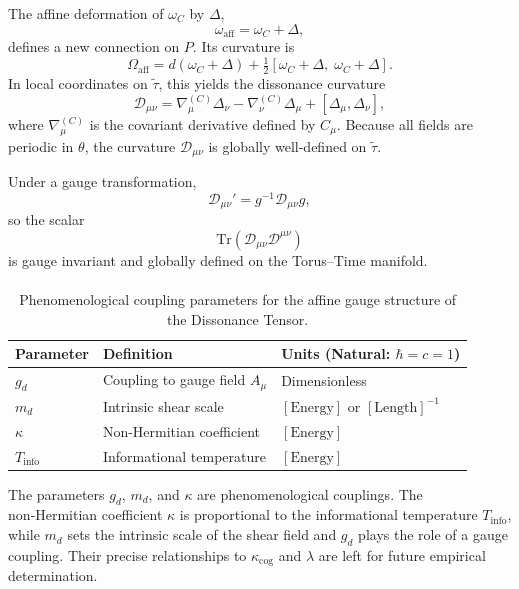 \documentclass[12pt,openany]{book}
\theoremstyle{plain}
\theoremstyle{definition}
\theoremstyle{remark}
\begin{document}
The affine deformation of $\omega_C$ by $\Delta$,
\[
\omega_{\mathrm{aff}} = \omega_C + \Delta,
\]
defines a new connection on $P$. Its curvature is
\[
\Omega_{\mathrm{aff}}
= d(\omega_C + \Delta)
+ \tfrac{1}{2}[\omega_C + \Delta,\; \omega_C + \Delta].
\]
In local coordinates on $\tilde{\tau}$, this yields the dissonance curvature
\[
\mathcal{D}_{\mu\nu}
= \nabla_\mu^{(C)} \Delta_\nu
- \nabla_\nu^{(C)} \Delta_\mu
+ [\Delta_\mu, \Delta_\nu],
\]
where $\nabla_\mu^{(C)}$ is the covariant derivative defined by $C_\mu$.
Because all fields are periodic in $\theta$, the curvature
$\mathcal{D}_{\mu\nu}$ is globally well-defined on $\tilde{\tau}$.

Under a gauge transformation,
\[
\mathcal{D}_{\mu\nu}' = g^{-1} \mathcal{D}_{\mu\nu} g,
\]
so the scalar
\[
\mathrm{Tr}(\mathcal{D}_{\mu\nu}\mathcal{D}^{\mu\nu})
\]
is gauge invariant and globally defined on the Torus--Time manifold.

\begin{table}[H]
    \centering
    \caption{Phenomenological coupling parameters for the affine gauge structure of the Dissonance Tensor.}
    \paragraph{}
    \label{tab:gauge_parameters}
    \renewcommand{\arraystretch}{1.4}
    \begin{tabular}{|l|l|l|}
        \hline
        \textbf{Parameter} & \textbf{Definition} & \textbf{Units (Natural: $\hbar=c=1$)} \\
        \hline
        $g_d$ & Coupling to gauge field $A_\mu$ & Dimensionless \\
        \hline
        $m_d$ & Intrinsic shear scale & $[\text{Energy}]$ or $[\text{Length}]^{-1}$ \\
        \hline
        $\kappa$ & Non-Hermitian coefficient & $[\text{Energy}]$ \\
        \hline
        $T_{\text{info}}$ & Informational temperature & $[\text{Energy}]$ \\
        \hline
    \end{tabular}
\end{table}

The parameters $g_d$, $m_d$, and $\kappa$ are phenomenological couplings.  
The non‑Hermitian coefficient $\kappa$ is proportional to the informational temperature
$T_{\text{info}}$, while $m_d$ sets the intrinsic scale of the shear field and $g_d$
plays the role of a gauge coupling.  Their precise relationships to
$\kappa_{\text{cog}}$ and $\lambda$ are left for future empirical determination.
\end{document}
